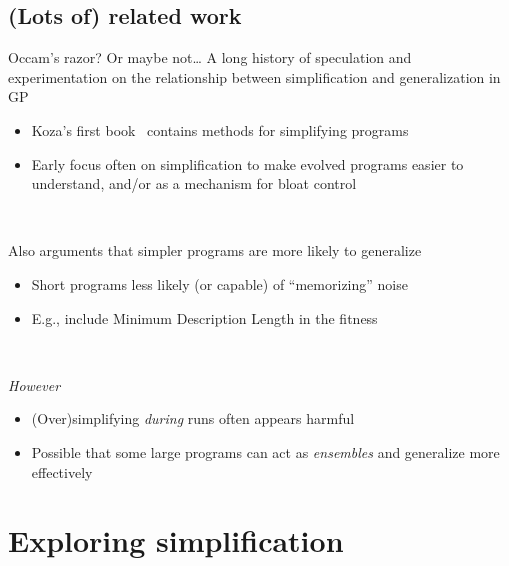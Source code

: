 \documentclass{beamer}
\begin{document}
\subsection{(Lots of) related work}

\begin{frame}{Occam's razor? Or maybe not\ldots}
A long history of speculation and experimentation on the relationship between simplification and generalization in GP
\begin{itemize}
	\item Koza's first book~\cite{koza1992genetic} contains methods for simplifying programs
	\item Early focus often on simplification to make evolved programs easier to understand, and/or as a mechanism for bloat control
\end{itemize}

~

Also arguments that simpler programs are more likely to generalize~\cite{hooper:1996:iarGPes}
\begin{itemize}
	\item Short programs less likely (or capable) of ``memorizing'' noise
	\item E.g., include Minimum Description Length in the fitness~\cite{iba1994genetic}
\end{itemize}

~

\emph{However}
\begin{itemize}
	\item (Over)simplifying \emph{during} runs often appears harmful
	\item Possible that some large programs can act as \emph{ensembles} and generalize more effectively~\cite{gonccalves2015generalization}
\end{itemize}


\end{frame}

\section{Exploring simplification}
\end{document}
